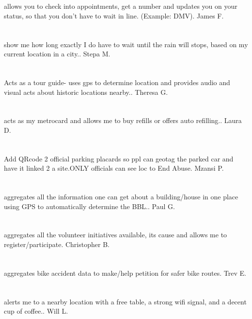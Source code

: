 \section{}allows you to check into appointments,  get a number and updates you on your status,  so that you don't have to wait in line. (Example: DMV). James F.
\section{}show me how long exactly I do have to wait until the rain will stops,  based on my current location in a city.. Stepa M.
\section{}Acts as a tour guide- uses gps to determine location and provides audio and visual acts about historic locations nearby.. Theresa G.
\section{}acts as my metrocard and allows me to buy refills or offers auto refilling.. Laura D.
\section{}Add QRcode 2 official parking placards so ppl can geotag the parked car and have it linked 2 a site.ONLY  officials can see loc to End Abuse. Mzansi P.
\section{}aggregates all the information one can get about a building/house in one place using GPS to automatically determine the BBL.. Paul G.
\section{}aggregates all the volunteer initiatives available,  its cause and allows me to register/participate. Christopher B.
\section{}aggregates bike accident data to make/help petition for safer bike routes. Trev E.
\section{} alerts me to a nearby location with a free table,  a strong wifi signal,  and a decent cup of coffee.. Will L.
